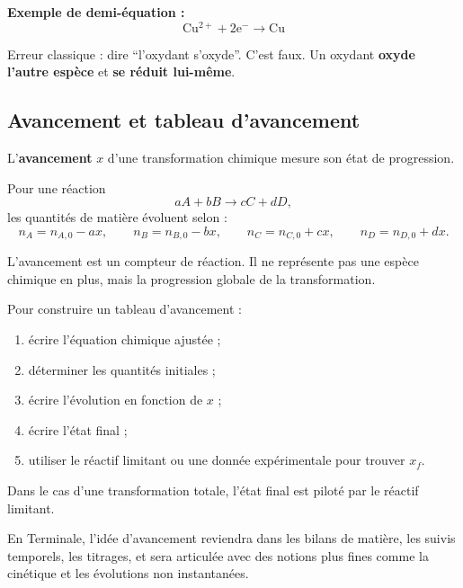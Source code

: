 \documentclass[11pt,a4paper]{article}
\begin{document}
\textbf{Exemple de demi-équation :}
\[
\mathrm{Cu^{2+}+2e^- \rightarrow Cu}
\]

\begin{attentionbox}
Erreur classique : dire ``l'oxydant s'oxyde''.  
C'est faux. Un oxydant \textbf{oxyde l'autre espèce} et \textbf{se réduit lui-même}.
\end{attentionbox}

\subsection{Avancement et tableau d'avancement}

\begin{definitionbox}
L'\textbf{avancement} \(x\) d'une transformation chimique mesure son état de progression.
\end{definitionbox}

Pour une réaction
\[
aA+bB \rightarrow cC+dD,
\]
les quantités de matière évoluent selon :
\[
n_A=n_{A,0}-ax,\qquad
n_B=n_{B,0}-bx,\qquad
n_C=n_{C,0}+cx,\qquad
n_D=n_{D,0}+dx.
\]

\begin{sensbox}
L'avancement est un compteur de réaction.  
Il ne représente pas une espèce chimique en plus, mais la progression globale de la transformation.
\end{sensbox}

\begin{methodebox}
Pour construire un tableau d'avancement :
\begin{enumerate}
    \item écrire l'équation chimique ajustée ;
    \item déterminer les quantités initiales ;
    \item écrire l'évolution en fonction de \(x\) ;
    \item écrire l'état final ;
    \item utiliser le réactif limitant ou une donnée expérimentale pour trouver \(x_f\).
\end{enumerate}
\end{methodebox}

\begin{proprbox}
Dans le cas d'une transformation totale, l'état final est piloté par le réactif limitant.
\end{proprbox}

\begin{terminalebox}
En Terminale, l'idée d'avancement reviendra dans les bilans de matière, les suivis temporels, les titrages, et sera articulée avec des notions plus fines comme la cinétique et les évolutions non instantanées.
\end{terminalebox}
\end{document}
